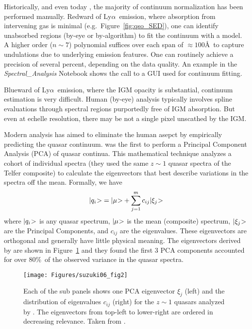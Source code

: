 \documentclass[graybox]{svmult}
\def\lya{Ly$\alpha$}
\def\ket#1{{|#1\negmedspace>}}
\def\smm{\sum\limits}
\begin{document}
Historically, and even today \cite[e.g.][]{kodiaq_dr1}, the majority of 
continuum normalization has been performed manually.  Redward
of \lya\ emission, where absorption from intervening gas is
minimal (e.g.\ Figure~\ref{fig:qso_SED}), one can identify
unabsorbed regions (by-eye or by-algorithm) to fit the
continuum with a model.  A higher order ($n \sim 7$)
polynomial suffices over each span of $\approx 100$\AA\ to
capture undulations due to underlying emission features.
One can routinely achieve a precision of several percent,
depending on the data quality.  An example in the 
{\it Spectral\_Analysis} Notebook shows the call to a 
GUI used for continuum fitting.

Blueward of \lya\ emission, where the IGM opacity is
substantial, continuum estimation is very difficult.
Human (by-eye) analysis typically involves spline evaluations
through spectral regions purportedly free of IGM absorption.
But even at echelle resolution, there may be not a single
pixel unscathed by the IGM.

Modern analysis has aimed to eliminate the human asepct
by empirically predicting the quasar continuum.  
\cite{suzuki06} was the first to perform a Principal
Component Analysis (PCA) of quasar continua.  This 
mathematical technique analyzes a cohort of individual
spectra (they used the same $z \sim 1$ quasar spectra
of the Telfer composite) to calculate the eigenvectors
that best describe variations in the spectra off the mean.
Formally, we have
\begin{equation}
\ket{q_i} = \ket{\mu} + \smm_{j=1}^{m} c_{ij} \ket{\xi_j}
\label{eqn:PCA}
\end{equation}
where $\ket{q_i}$ is any quasar spectrum,
$\ket{\mu}$ is the mean (composite) spectrum,
$\ket{\xi_j}$ are the Principal Components, and
$c_{ij}$ are the eigenvalues.
These eigenvectors are orthogonal and generally
have little physical meaning.  The eigenvectors
derived by \cite{suzuki06}
are shown in Figure~\ref{fig:PCA} and they found
the first 3 PCA components accounted for over
80\%\ of the observed variance in the quasar spectra.

%
\begin{figure}[b]
\sidecaption
\texttt{[image: Figures/suzuki06\_fig2]}
%
%
\caption{Each of the sub panels shows one PCA eigenvector 
$\xi_j$  (left) 
and the distribution of eigenvalues $c_{ij}$ (right) for the 
$z\sim 1$ quasars analyzed by \cite{suzuki06}.
The eigenvectors from top-left to lower-right are ordered
in decreasing relevance.
Taken from \cite{suzuki06}.
}
\label{fig:PCA}       %
\end{figure}
\end{document}
